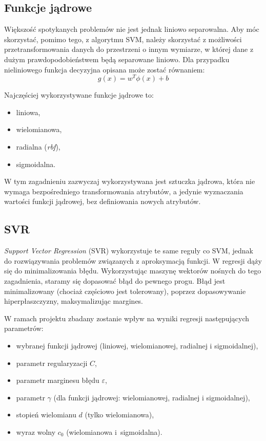  \subsection{Funkcje jądrowe}
 Większość spotykanych problemów nie jest jednak liniowo separowalna. Aby móc skorzystać, pomimo tego, z algorytmu SVM, należy skorzystać z możliwości przetransformowania danych do przestrzeni o innym wymiarze, w której dane z dużym prawdopodobieństwem będą separowane liniowo. Dla przypadku nieliniowego funkcja decyzyjna opisana może zostać równaniem:
 \begin{equation}
 g(x) = w^{T}\phi(x)+b
 \end{equation}

 Najczęściej wykorzystywane funkcje jądrowe to:
 \begin{itemize}
      \item liniowa,
    \item wielomianowa,
    \item radialna (\textit{rbf}),
    \item sigmoidalna.
 \end{itemize}
 W tym zagadnieniu zazwyczaj wykorzystywana jest sztuczka jądrowa, która nie wymaga bezpośredniego transformowania atrybutów, a jedynie wyznaczania wartości funkcji jądrowej, bez definiowania nowych atrybutów.
 \subsection{SVR}
 \textit{Support Vector Regression} (SVR) wykorzystuje te same reguły co SVM, jednak do rozwiązywania problemów związanych z aproksymacją funkcji. 
 W regresji dąży się do minimalizowania błędu. Wykorzystując maszynę wektorów nośnych do tego zagadnienia, staramy się dopasować błąd do pewnego progu. Błąd jest minimalizowany (chociaż częściowo jest tolerowany), poprzez dopasowywanie hiperpłaszczyzny, maksymalizując margines.
 
W ramach projektu zbadany zostanie wpływ na wyniki regresji następujących parametrów:
\begin{itemize}
    \item wybranej funkcji jądrowej (liniowej, wielomianowej, radialnej i sigmoidalnej),
    \item parametr regularyzacji $C$,
    \item parametr marginesu błędu $\varepsilon$,
    \item parametr $\gamma$ (dla funkcji jądrowej: wielomianowej, radialnej i sigmoidalnej),
    \item stopień wielomianu $d$ (tylko wielomianowa),
    \item wyraz wolny $c_{0}$ (wielomianowa i~sigmoidalna).
\end{itemize}